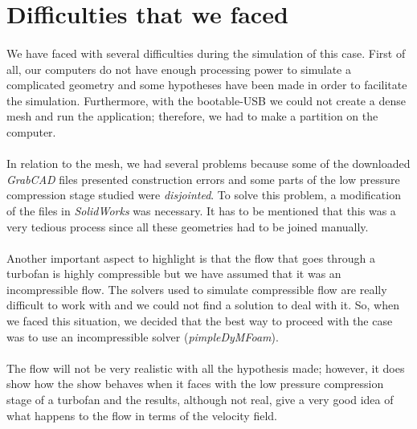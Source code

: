 \section{Difficulties that we faced}

\paragraph{}We have faced with several difficulties during the simulation of this case. First of all, our computers do not have enough processing power to simulate a complicated geometry and some hypotheses have been made in order to facilitate the simulation. Furthermore, with the bootable-USB we could not create a dense mesh and run the application; therefore, we had to make a partition on the computer.

\paragraph{}In relation to the mesh, we had several problems because some of the downloaded \textit{GrabCAD} files presented construction errors and some parts of the low pressure compression stage studied were \textit{disjointed}. To solve this problem, a modification of the files in \textit{SolidWorks} was necessary. It has to be mentioned that this was a very tedious process since all these geometries had to be joined manually.

\paragraph{}Another important aspect to highlight is that the flow that goes through a turbofan is highly compressible but we have assumed that it was an incompressible flow. The solvers used to simulate compressible flow are really difficult to work with and we could not find a solution to deal with it. So, when we faced this situation, we decided that the best way to proceed with the case was to use an incompressible solver (\textit{pimpleDyMFoam}).

\paragraph{}The flow will not be very realistic with all the hypothesis made; however, it does show how the show behaves when it faces with the low pressure compression stage of a turbofan and the results, although not real, give a very good idea of what happens to the flow in terms of the velocity field.